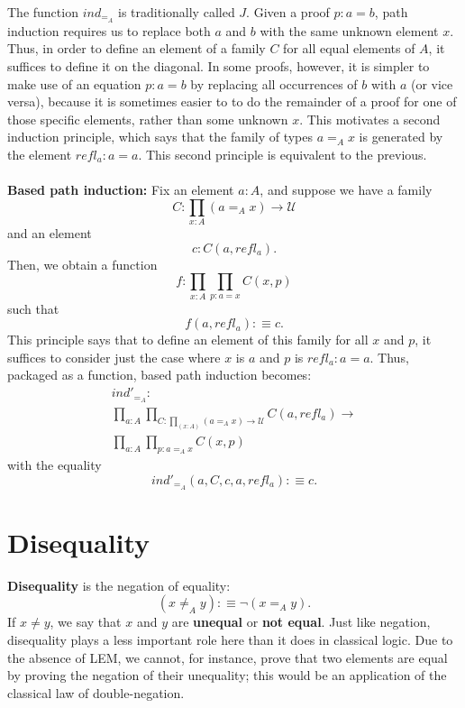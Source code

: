 \documentclass[letterpaper, 10 pt, conference]{ieeeconf}  %
\begin{document}
The function $ind_{=_A}$  is traditionally called $J$. Given a proof $p : a = b$, path induction requires us to replace both $a$ and $b$ with the same unknown element $x$. Thus, in order to define an element of a family $C$ for all equal elements of $A$, it suffices to define it on the diagonal. In some proofs, however, it is simpler to make use of an equation $p : a = b$ by replacing all occurrences of $b$ with $a$ (or vice versa), because it is sometimes easier to to do the remainder of a proof for one of those specific elements, rather than some unknown $x$. This motivates a second induction principle, which says that the family of types $a =_A x$ is generated by the element $refl_a : a = a$. This second principle is equivalent to the previous.
\\
\\
\textbf{Based path induction:} Fix an element $a : A$, and suppose we have a family
\begin{equation}
    C : \prod_{x:A} (a =_A x) \rightarrow \mathcal{U}
\end{equation}
and an element
\begin{equation}
    c : C(a, refl_a).
\end{equation}
Then, we obtain a function
\begin{equation}
    f : \prod_{x:A} \prod_{p : a = x} C(x,p)
\end{equation}
such that 
\begin{equation}
    f(a,refl_a) :\equiv c.
\end{equation}
This principle says that to define an element of this family for all $x$ and $p$, it suffices to consider just the case where $x$ is $a$ and $p$ is $refl_a : a = a$. Thus, packaged as a function, based path induction becomes:
\begin{multline}
    ind'_{=_A} : \\
    \prod_{a : A} \prod_{C : \prod_{(x:A)} (a =_A x) \rightarrow \mathcal{U}} C(a,refl_a) \rightarrow \\
    \prod_{a:A} \prod_{p: a =_A x} C(x,p)
\end{multline}
with the equality
\begin{equation}
    ind'_{=_A}(a, C, c, a, refl_a) :\equiv c.
\end{equation}

\section{Disequality}
\textbf{Disequality} is the negation of equality:
\begin{equation}
    (x \neq_A y) :\equiv \neg (x =_A y).
\end{equation}
If $x \neq y$, we say that $x$ and $y$ are \textbf{unequal} or \textbf{not equal}. Just like negation, disequality plays a less important role here than it does in classical logic. Due to the absence of LEM, we cannot, for instance, prove that two elements are equal by proving the negation of their unequality; this would be an application of the classical law of double-negation. 
    
\end{document}
